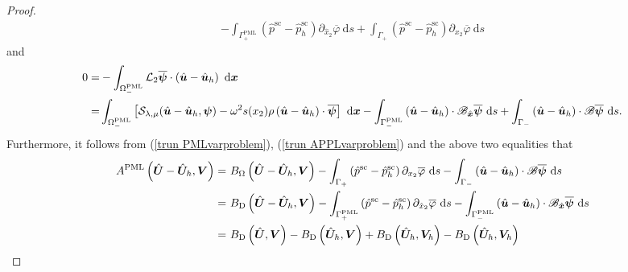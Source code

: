 \documentclass[10pt,a4paper]{amsart}
\begin{document}
\begin{proof}
\begin{align*}
		- \int_{\Gamma_+^\mathrm{PML}}\left(\hat{p}^{\mathrm{sc}}-\hat{p}^{\mathrm{sc}}_h\right) \partial_{\hat{x}_2} \overline{\varphi} \mathrm{~d} s
		+ \int_{\Gamma_+}\left(\hat{p}^{\mathrm{sc}}-\hat{p}^{\mathrm{sc}}_h\right) \partial_{x_2} \overline{\varphi} \mathrm{~d} s
	\end{align*}
	and 
	\begin{align*}
		0=&-\int_{\Omega^{\mathrm{PML}}_-}\mathcal{L}_2\overline{\boldsymbol{\psi}}\cdot\left(\hat{\boldsymbol{u}}-\hat{\boldsymbol{u}}_h\right)   \mathrm{~d} \boldsymbol{x} \notag\\
		= &\int_{\Omega^{\mathrm{PML}}_-}\left[\mathcal{S}_{\lambda, \mu}(\hat{\boldsymbol{u}}-\hat{\boldsymbol{u}}_h, \boldsymbol{\psi}) - \omega^2 s(x_2) \rho \left(\hat{\boldsymbol{u}}-\hat{\boldsymbol{u}}_h\right) \cdot \overline{\boldsymbol{\psi}}\right] \mathrm{~d} \boldsymbol{x}
		- \int_{\Gamma_-^\mathrm{PML}} \left(\hat{\boldsymbol{u}}-\hat{\boldsymbol{u}}_h\right) \cdot \mathscr{B}_{\hat{\boldsymbol{x}}} \overline{\boldsymbol{\psi}} \mathrm{~d} s
		+ \int_{\Gamma_-} \left(\hat{\boldsymbol{u}}-\hat{\boldsymbol{u}}_h\right) \cdot \mathscr{B} \overline{\boldsymbol{\psi}} \mathrm{~d} s.
	\end{align*}
	Furthermore, it follows from (\ref{trun PMLvarproblem}), (\ref{trun APPLvarproblem}) and the above two equalities that
	\begin{align}\label{4.2.2}
		A^{\mathrm{PML}}\left(\hat{\boldsymbol{U}}-\hat{\boldsymbol{U}}_h,\boldsymbol{V}\right)
		=&~ B_{\Omega}\left(\hat{\boldsymbol{U}}-\hat{\boldsymbol{U}}_h, \boldsymbol{V}\right) - \int_{\Gamma_+}\left(\hat{p}^{\mathrm{sc}}-\hat{p}^{\mathrm{sc}}_h\right) \partial_{x_2} \overline{\varphi} \mathrm{~d} s
		- \int_{\Gamma_-} \left(\hat{\boldsymbol{u}}-\hat{\boldsymbol{u}}_h\right) \cdot \mathscr{B} \overline{\boldsymbol{\psi}} \mathrm{~d} s \notag\\
		=&~B_\mathrm{D}\left(\hat{\boldsymbol{U}}-\hat{\boldsymbol{U}}_h, \boldsymbol{V}\right)
		- \int_{\Gamma_+^\mathrm{PML}}\left(\hat{p}^{\mathrm{sc}}-\hat{p}^{\mathrm{sc}}_h\right) \partial_{\hat{x}_2} \overline{\varphi} \mathrm{~d} s
		- \int_{\Gamma_-^\mathrm{PML}} \left(\hat{\boldsymbol{u}}-\hat{\boldsymbol{u}}_h\right) \cdot \mathscr{B}_{\hat{\boldsymbol{x}}} \overline{\boldsymbol{\psi}} \mathrm{~d} s\notag\\
		=&~ B_\mathrm{D}\left(\hat{\boldsymbol{U}}, \boldsymbol{V}\right) -B_\mathrm{D}\left(\hat{\boldsymbol{U}}_h, \boldsymbol{V}\right)
		+ B_\mathrm{D}\left(\hat{\boldsymbol{U}}_h, \boldsymbol{V}_h\right)
		- B_\mathrm{D}\left(\hat{\boldsymbol{U}}_h, \boldsymbol{V}_h\right)

\end{align}
\end{proof}
\end{document}
